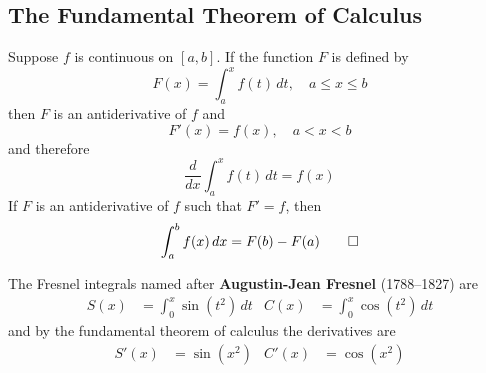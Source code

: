 \subsection{The Fundamental Theorem of Calculus}
\begin{theorem}
    Suppose \(f\) is continuous on \([a,b]\).
    If the function \(F\) is defined by
    \[F(x)=\int_a^xf(t)\,dt,\quad a\leq x\leq b\]
    then \(F\) is an antiderivative of \(f\) and \[F'(x)=f(x),\quad a<x<b\]
    and therefore\[\frac{d}{dx}\int_a^x f(t)\,dt=f(x)\]
    If \(F\) is an antiderivative of \(f\) such that \(F'=f\), then
    \[\int_a^b f(x)\,dx=F(b)-F(a)\qedhere\]
\end{theorem}
The Fresnel integrals named after \textbf{Augustin-Jean Fresnel} (1788--1827)
are
\begin{align*}
    S(x) &= \int_0^x\sin(t^2)\,dt & C(x) &= \int_0^x\cos(t^2)\,dt
\end{align*}
and by the fundamental theorem of calculus the derivatives are
\begin{align*}
    S'(x) &= \sin(x^2) & C'(x) &= \cos(x^2)
\end{align*}